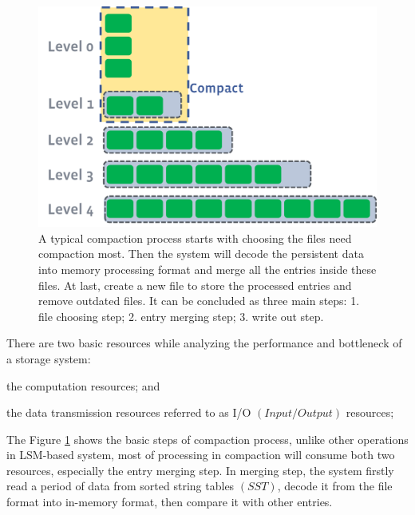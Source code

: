 \documentclass[letterpaper,twocolumn,10pt]{article}
\begin{document}
\begin{figure}
    \begin{center}
        \includegraphics[width=\columnwidth]{2018-12-24-15-28-12.png}
    \end{center}
    \caption{\label{fig:simple_compaction} A typical compaction process starts with choosing the files need compaction most. Then the system will decode the persistent data into memory processing format and merge all the entries inside these files. At last, create a new file to store the processed entries and remove outdated files. It can be concluded as three main steps: 1. file choosing step; 2. entry merging step; 3. write out step.}
\end{figure}

There are two basic resources while analyzing the performance and bottleneck of a storage system:
\begin{inparaenum}[1)]
    \item the computation resources; and
    \item the data transmission resources referred to as I/O $(Input/Output)$ resources;
\end{inparaenum}
The Figure \ref{fig:simple_compaction} shows the basic steps of compaction process, unlike other operations in LSM-based system, most of processing in compaction will consume both two resources, especially the entry merging step. In merging step, the system firstly read a period of data from sorted string tables $(SST)$, decode it from the file format into in-memory format, then compare it with other entries.
\end{document}
